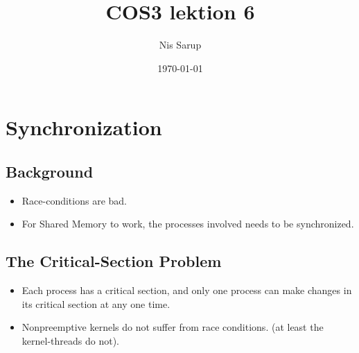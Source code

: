 \documentclass[a4wide,10pt]{article}
\begin{document}
\title{COS3 lektion 6}
\author{Nis Sarup}
\date{\today}
\maketitle


\addtocounter{section}{5}
\section{Synchronization} %
\label{sec:background}

\subsection{Background} %
\label{sub:background}
\begin{itemize}
	\item Race-conditions are bad.
	\item For Shared Memory to work, the processes involved needs to be synchronized.
\end{itemize}

\subsection{The Critical-Section Problem} %
\label{sub:the_critical_section_problem}
\begin{itemize}
	\item Each process has a critical section, and only one process can make changes in its critical section at any one time.
	\item Nonpreemptive kernels do not suffer from race conditions. (at least the kernel-threads do not).
\end{itemize}

\addtocounter{subsection}{2}
\end{document}
